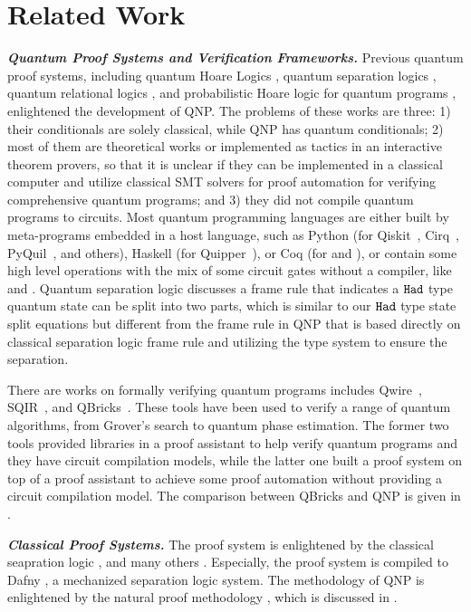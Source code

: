 \section{Related Work}
\label{sec:related}

\noindent\textbf{\textit{Quantum Proof Systems and Verification Frameworks.}}
Previous quantum proof systems, including quantum Hoare Logics \cite{qhoare,qhoreusage,10.1145/3456877,10.1007/s00165-018-0465-3},
quantum separation logics \cite{qseplocal,qsepa}, quantum relational logics \cite{relationlogic,10.1145/3290346}, and probabilistic Hoare logic for quantum programs \cite{10.1007/978-3-642-10622-4_7}, enlightened the development of QNP. The problems of these works are three: 1) their conditionals are solely classical, while QNP has quantum conditionals; 2) most of them are theoretical works or implemented as tactics in an interactive theorem provers, so that it is unclear if they can be implemented in a classical computer and utilize classical SMT solvers for proof automation for verifying comprehensive quantum programs; and 3) they did not compile quantum programs to circuits.  Most quantum programming languages are either built by meta-programs embedded in a host language, such as Python (for Qiskit~\cite{Qiskit}, Cirq~\cite{cirq}, PyQuil~\cite{PyQuil}, and others), Haskell (for Quipper~\cite{Green2013}), or Coq (for \sqir and \voqc \cite{VOQC}), or contain some high level operations with the mix of some circuit gates without a compiler, like \cite{sliqlanguage} and \cite{qsharp}.
Quantum separation logic \cite{qseplocal} discusses a frame rule that indicates a $\texttt{Had}$ type quantum state can be split into two parts, which is similar to our $\texttt{Had}$ type state split equations but different from the frame rule in QNP that is based directly on classical separation logic frame rule and utilizing the \qafny type system to ensure the separation. 

There are works on formally verifying quantum programs includes Qwire~\cite{RandThesis}, SQIR~\cite{PQPC}, and QBricks~\cite{qbricks}. These tools have been used to verify a range of quantum algorithms, from Grover's search to quantum phase estimation.
The former two tools provided libraries in a proof assistant to help verify quantum programs and they have circuit compilation models, while the latter one built a proof system on top of a proof assistant to achieve some proof automation without providing a circuit compilation model. The comparison between QBricks and QNP is given in .

\noindent\textbf{\textit{Classical Proof Systems.}}
The \qafny proof system is enlightened by the classical seapration logic \cite{separationlogic}, and many others \cite{10.1145/3453483.3454087,arxiv.1609.00919,10.1007/978-3-319-89960-2_13,10.1007/978-3-319-89960-2_2,nat-proof-fun}. Especially, the \qafny proof system is compiled to Dafny \cite{10.1007/978-3-642-17511-4_20}, a mechanized separation logic system. The methodology of QNP is enlightened by the natural proof methodology \cite{nat-proof-fun,nat-proof-frame,10.1145/2103621.2103673}, which is discussed in .



